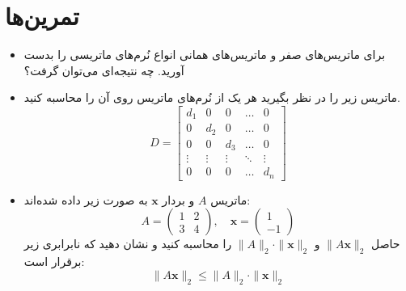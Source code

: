 \begin{code}
	\begin{latin}
		  
	\end{latin}
\end{code}
\section{تمرین‌ها}
\begin{exercise}
	\begin{itemize}
		\item 
برای ماتریس‌های صفر و ماتریس‌های همانی انواع نُرم‌های ماتریسی را بدست آورید. چه نتیجه‌ای می‌توان گرفت؟
\item 
ماتریس زیر را در نظر بگیرید هر یک از نُرم‌های ماتریس روی آن را محاسبه کنید.
\[
D =
\begin{bmatrix}
	d_1 & 0 & 0 & \dots & 0 \\
	0 & d_2 & 0 & \dots & 0 \\
	0 & 0 & d_3 & \dots & 0 \\
	\vdots & \vdots & \vdots & \ddots & \vdots \\
	0 & 0 & 0 & \dots & d_n
\end{bmatrix}
\]
\item
ماتریس \( A \) و بردار \( \mathbf{x} \) به صورت زیر داده شده‌اند:
\[
A = \begin{pmatrix}
	1 & 2 \\
	3 & 4
\end{pmatrix}, \quad
\mathbf{x} = \begin{pmatrix}
	1 \\
	-1
\end{pmatrix}
\]
حاصل \( \|A\mathbf{x}\|_2 \) و \( \|A\|_2 \cdot \|\mathbf{x}\|_2 \) را محاسبه کنید و نشان دهید که نابرابری زیر برقرار است:
\[
\|A\mathbf{x}\|_2 \leq \|A\|_2 \cdot \|\mathbf{x}\|_2
\]
\end{itemize}
\end{exercise}
